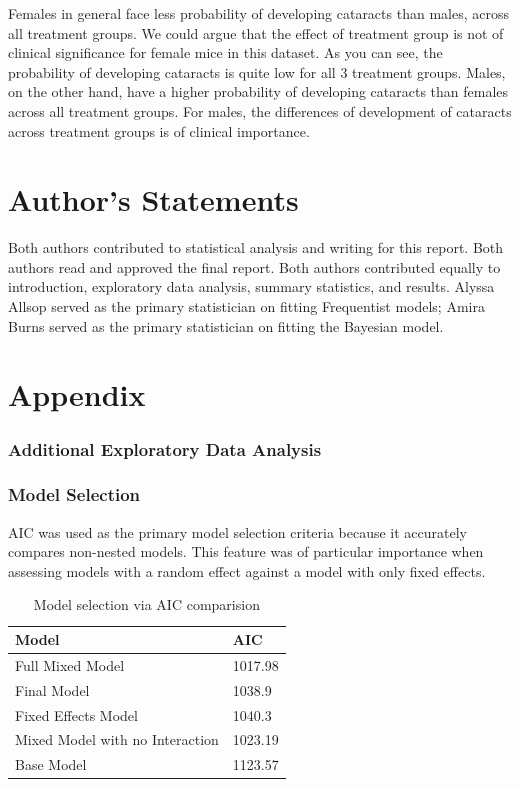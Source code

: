 \documentclass[12pt]{article}
\begin{document}
Females in general face less probability of developing cataracts than males, across all treatment groups. We could argue that the effect of treatment group is not of clinical significance for female mice in this dataset. As you can see, the probability of developing cataracts is quite low for all 3 treatment groups. Males, on the other hand, have a higher probability of developing cataracts than females across all treatment groups. For males, the differences of development of cataracts across treatment groups is of clinical importance.

\section{Author's Statements}
\label{sec:auth}

Both authors contributed to statistical analysis and writing for this report. Both authors read and approved the final report. Both authors contributed equally to introduction, exploratory data analysis, summary statistics, and results. Alyssa Allsop served as the primary statistician on fitting Frequentist models; Amira Burns served as the primary statistician on fitting the Bayesian model.

\section{Appendix}
\label{sec:appendix}

\hypertarget{additional-exploratory-data-analysis}{%
\subsubsection{Additional Exploratory Data Analysis}\label{additional-exploratory-data-analysis}}

\hypertarget{model-selection}{%
\subsubsection{Model Selection}\label{model-selection}}

AIC was used as the primary model selection criteria because it accurately compares non-nested models. This feature was of particular importance when assessing models with a random effect against a model with only fixed effects.

\begin{table}[!h]
\centering
\begin{tabular}{ll}
  \toprule
Model & AIC \\ 
  \midrule
Full Mixed Model & 1017.98 \\ 
  Final Model & 1038.9 \\ 
  Fixed Effects Model & 1040.3 \\ 
  Mixed Model with no Interaction & 1023.19 \\ 
  Base Model & 1123.57 \\ 
   \bottomrule
\end{tabular}
\caption{Model selection via AIC comparision} 
\end{table}
\end{document}
